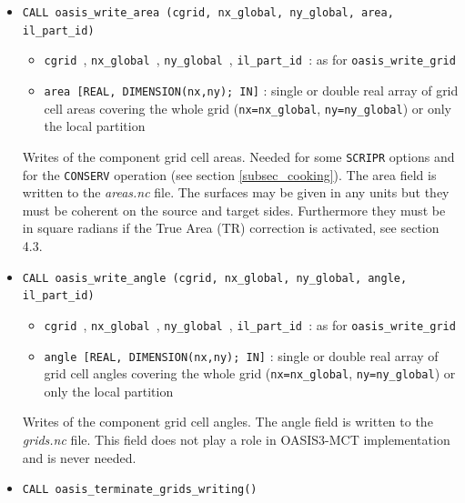 \begin{itemize}
\begin{itemize}
  \end{itemize}
  Writes the component grid cell static fractions.  This should be consistent
  with the mask field and defines the fraction of the grid cell that
  is active (i.e. not masked), e.g. the water fraction of an atmospheric cell having water and land fractions.  The fraction field is only used in the
  global {\tt CONSERV} operations. Either the mask or fractions must be defined for that operation.  If both are defined, they must be consistent; OASIS3-MCT will abort if they are not coherent or if both are missing.  Note that by OASIS3-MCT conventions for the mask, a gridcell with mask=0 (active) should have a fractions greater than 0 and a gridcell with mask=1 (inactive) should have a fractions equal to 0.  The fraction field is written to the {\em masks.nc} file.

  \vspace{0.2cm}
\item {\tt CALL oasis\_write\_area (cgrid, nx\_global, ny\_global, area, il\_part\_id)}

  \begin{itemize}
  \item {\tt cgrid }, {\tt nx\_global }, {\tt ny\_global }, {\tt il\_part\_id }: as for {\tt oasis\_write\_grid}
  \item {\tt area [REAL, DIMENSION(nx,ny); IN]} : single or double real array of grid cell
    areas covering the whole grid ({\tt nx=nx\_global}, {\tt ny=ny\_global}) or only the local partition
  \end{itemize}
  Writes of the component grid cell areas. Needed for some {\tt SCRIPR} options and for the {\tt CONSERV}
  operation (see section \ref{subsec_cooking}).    The area field is written to the {\em areas.nc} file.
  The surfaces may be given in any units but they must be coherent on
  the source and target sides. Furthermore they must be in square radians if the True Area (TR) correction is activated, see section 4.3.

  \vspace{0.2cm}
\item {\tt CALL oasis\_write\_angle (cgrid, nx\_global, ny\_global, angle, il\_part\_id)}

  \begin{itemize}
  \item {\tt cgrid }, {\tt nx\_global }, {\tt ny\_global }, {\tt il\_part\_id }: as for {\tt oasis\_write\_grid}
  \item {\tt angle [REAL, DIMENSION(nx,ny); IN]} : single or double real array of grid cell
    angles covering the whole grid ({\tt nx=nx\_global}, {\tt ny=ny\_global}) or only the local partition
  \end{itemize}
  Writes of the component grid cell angles.  The angle field is written to the {\em grids.nc} file.  This field does not play a role in OASIS3-MCT implementation and is never needed.


  \vspace{0.2cm}
\item {\tt CALL oasis\_terminate\_grids\_writing()}

\end{itemize}

